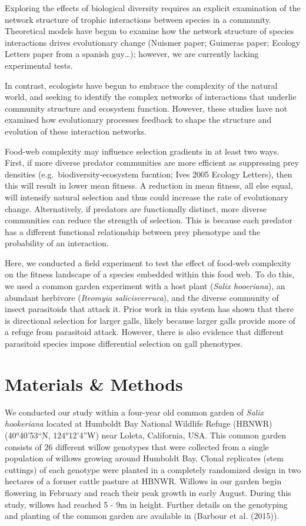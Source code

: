 \documentclass[]{elsarticle} %
\begin{document}
Exploring the effects of biological diversity requires an explicit
examination of the network structure of trophic interactions between
species in a community. Theoretical models have begun to examine how the
network structure of species interactions drives evolutionary change
(Nuismer paper; Guimeras paper; Ecology Letters paper from a spanish
guy\ldots{}); however, we are currently lacking experimental tests.

In contrast, ecologists have begun to embrace the complexity of the
natural world, and seeking to identify the complex networks of
interactions that underlie community structure and ecosystem function.
However, these studies have not examined how evolutionary processes
feedback to shape the structure and evolution of these interaction
networks.

Food-web complexity may influence selection gradients in at least two
ways. First, if more diverse predator communities are more efficient as
suppressing prey densities (e.g.~biodiversity-ecosystem fucntion; Ives
2005 Ecology Letters), then this will result in lower mean fitness. A
reduction in mean fitness, all else equal, will intensify natural
selection and thus could increase the rate of evolutionary change.
Alternatively, if predators are functionally distinct, more diverse
communities can reduce the strength of selection. This is because each
predator has a different functional relationship between prey phenotype
and the probability of an interaction.

Here, we conducted a field experiment to test the effect of food-web
complexity on the fitness landscape of a species embedded within this
food web. To do this, we used a common garden experiment with a host
plant (\emph{Salix hooeriana}), an abundant herbivore (\emph{Iteomyia
salicisverruca}), and the diverse community of insect parasitoids that
attack it. Prior work in this system has shown that there is directional
selection for larger galls, likely because larger galls provide more of
a refuge from parasitoid attack. However, there is also evidence that
different parasitoid species impose differential selection on gall
phenotypes.

\section{Materials \& Methods}\label{materials-methods}

We conducted our study within a four-year old common garden of
\emph{Salix hookeriana} located at Humboldt Bay National Wildlife Refuge
(HBNWR) (40°40'53``N, 124°12'4''W) near Loleta, California, USA. This
common garden consists of 26 different willow genotypes that were
collected from a single population of willows growing around Humboldt
Bay. Clonal replicates (stem cuttings) of each genotype were planted in
a completely randomized design in two hectares of a former cattle
pasture at HBNWR. Willows in our garden begin flowering in February and
reach their peak growth in early August. During this study, willows had
reached 5 - 9m in height. Further details on the genotyping and planting
of the common garden are available in (Barbour et al. (2015)).
\end{document}
